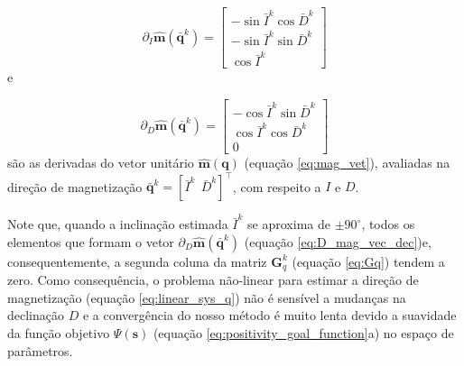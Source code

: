 \begin{equation}
\partial_{I} \hat{\mathbf{m}}(\bar{\mathbf{q}}^{k}) = 
\begin{bmatrix}
	-\sin \bar{I}^{k} \cos \bar{D}^{k} \\
	-\sin \bar{I}^{k} \sin \bar{D}^{k} \\
	 \cos \bar{I}^{k}
\end{bmatrix}
\label{eq:D_mag_vec_inc}
\end{equation}
e 

\begin{equation}
\partial_{D} \hat{\mathbf{m}}(\bar{\mathbf{q}}^{k}) = 
\begin{bmatrix}
	-\cos \bar{I}^{k} \sin \bar{D}^{k} \\
	 \cos \bar{I}^{k} \cos \bar{D}^{k} \\
	 0
\end{bmatrix}
\label{eq:D_mag_vec_dec}
\end{equation}
são as derivadas do vetor unitário $\hat{\mathbf{m}}(\mathbf{q})$ (equação \ref{eq:mag_vet}), avaliadas na direção de magnetização $\bar{\mathbf{q}}^{k} = \left[ \bar{I}^{k} \:\: \bar{D}^{k} \right]^{\top}$, com respeito a $I$ e $D$. 
 
Note que, quando a inclinação estimada $\bar{I}^{k}$ se aproxima de $\pm 90^{\circ}$, todos os elementos que formam o vetor  $\partial_{D} \hat{\mathbf{m}}(\bar{\mathbf{q}}^{k})$ (equação \ref{eq:D_mag_vec_dec})e, consequentemente, a segunda coluna da matriz $\mathbf{G}_{q}^{k}$ (equação \ref{eq:Gq}) tendem a zero. Como consequência, o problema não-linear para estimar a direção de magnetização (equação \ref{eq:linear_sys_q}) não é sensível a mudanças na declinação $D$ e a convergência do nosso método é muito lenta devido a suavidade da função objetivo $\Psi(\mathbf{s})$ (equação \ref{eq:positivity_goal_function}a) no espaço de parâmetros. 

